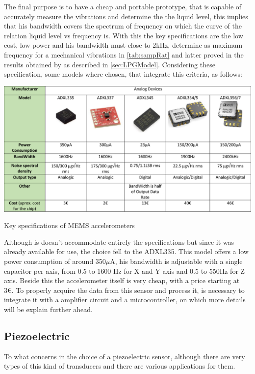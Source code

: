 The final purpose is to have a cheap and portable prototype, that is capable of accurately measure the vibrations and determine the the liquid level, this implies that his bandwidth covers the spectrum of frequency on which the curve of the relation liquid level vs frequency is. With this the key specifications are the low cost, low power and his bandwidth must close to 2kHz, determine as maximum frequency for a mechanical vibrations in \ref{tab:sampRat} and latter proved in the results obtained by \citeauthor{wuLiquidLevelDetector2014b} as described in \ref{sec:LPGModel}. Considering these specification, some models where chosen, that integrate this criteria, as follows:
\begin{table}
    \centering
    \includegraphics[width=1\textwidth]{Chapters/4CHP/Figures/accTable.pdf}
    \caption{Key specifications of MEMS accelerometers}
    \label{tab:acctable}
\end{table}
Although is doesn't accommodate entirely the specifications but since it was already available for use, the choice fell to the ADXL335. This model offers a low power consumption of around 350$\mu$A, his bandwidth is adjustable with a single capacitor per axis, from 0.5 to 1600 Hz for X and Y axis and 0.5 to 550Hz for Z axis. Beside this the accelerometer itself is very cheap, with a price starting at 3€. To properly acquire the data from this sensor and process it, is necessary to integrate it with a amplifier circuit and a microcontroller, on which more details will be explain further ahead.
\subsection{Piezoelectric}
To what concerns in the choice of a piezoelectric sensor, although there are very types of this kind of transducers and there are various applications for them.  
